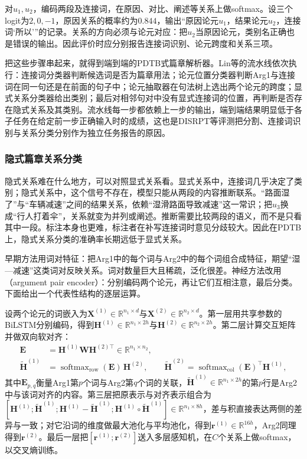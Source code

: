 对$u_1,u_2$，编码两段及连接词，在原因、对比、阐述等关系上做softmax。设三个logit为$2,0,-1$，原因关系的概率约为$0.844$，输出“原因论元$u_1$，结果论元$u_2$，连接词‘所以’”的记录。关系的方向必须与论元对应：把$u_2$当原因论元，类别名正确也是错误的输出。因此评价时应分别报告连接词识别、论元跨度和关系三项。

把这些步骤串起来，就得到端到端的PDTB式篇章解析器。Lin等的流水线依次执行：连接词分类器判断候选词是否为篇章用法；论元位置分类器判断Arg1与连接词在同一句还是在前面的句子中；论元抽取器在句法树上选出两个论元的跨度；显式关系分类器给出类别；最后对相邻句对中没有显式连接词的位置，再判断是否存在隐式关系及其类别。流水线每一步都依赖上一步的输出，端到端结果明显低于各子任务在给定前一步正确输入时的成绩，这也是DISRPT等评测把分割、连接词识别与关系分类分别作为独立任务报告的原因。

\subsubsection{隐式篇章关系分类}
\label{sec:nlp-analysis-implicit-relation}

隐式关系难在什么地方，可以对照显式关系看。显式关系中，连接词几乎决定了类别；隐式关系中，这个信号不存在，模型只能从两段的内容推断联系。“路面湿了”与“车辆减速”之间的结果关系，依赖“湿滑路面导致减速”这一常识；把$u_3$换成“行人打着伞”，关系就变为并列或阐述。推断需要比较两段的语义，而不是只看其中一段。标注本身也更难，标注者在补写连接词时意见分歧较大。因此在PDTB上，隐式关系分类的准确率长期远低于显式关系。

早期方法用词对特征：把Arg1中的每个词与Arg2中的每个词组合成特征，期望“湿—减速”这类词对反映关系。词对数量巨大且稀疏，泛化很差。神经方法改用（argument pair encoder）：分别编码两个论元，再让它们互相注意，最后分类。下面给出一个代表性结构的逐层运算。

设两个论元的词嵌入为$\bm X^{(1)}\in\mathbb R^{n_1\times d}$与$\bm X^{(2)}\in\mathbb R^{n_2\times d}$。第一层用共享参数的BiLSTM分别编码，得到$\bm H^{(1)}\in\mathbb R^{n_1\times 2h}$与$\bm H^{(2)}\in\mathbb R^{n_2\times 2h}$。第二层计算交互矩阵并做双向软对齐：
\begin{equation}
  \begin{aligned}
    \bm E&=\bm H^{(1)}\bm W\bm H^{(2)\top}\in\mathbb R^{n_1\times n_2},\\
    \tilde{\bm H}^{(1)}&=\operatorname{softmax}_{\mathrm{row}}(\bm E)\,\bm H^{(2)},\qquad
    \tilde{\bm H}^{(2)}=\operatorname{softmax}_{\mathrm{col}}(\bm E)^{\top}\bm H^{(1)},
  \end{aligned}
  \label{eq:nlp-analysis-implicit-interaction}
\end{equation}
其中$\bm E_{p,q}$衡量Arg1第$p$个词与Arg2第$q$个词的关联，$\tilde{\bm H}^{(1)}\in\mathbb R^{n_1\times 2h}$的第$p$行是Arg2中与该词对齐的内容。第三层把原表示与对齐表示组合为$[\bm H^{(1)};\tilde{\bm H}^{(1)};\bm H^{(1)}-\tilde{\bm H}^{(1)};\bm H^{(1)}\circ\tilde{\bm H}^{(1)}]\in\mathbb R^{n_1\times 8h}$，差与积直接表达两侧的差异与一致；对它沿词的维度做最大池化与平均池化，得到$\bm r^{(1)}\in\mathbb R^{16h}$，Arg2同理得到$\bm r^{(2)}$。最后一层把$[\bm r^{(1)};\bm r^{(2)}]$送入多层感知机，在$C$个关系上做softmax，以交叉熵训练。

